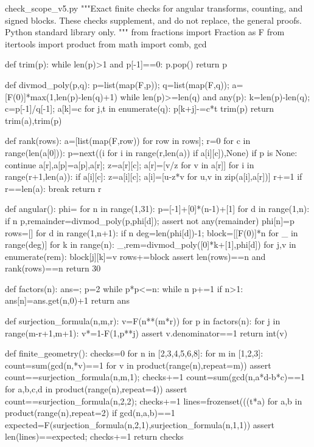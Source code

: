 \begin{filecontents*}[overwrite]{check_scope_v5.py}
"""Exact finite checks for angular transforms, counting, and signed blocks.
These checks supplement, and do not replace, the general proofs.
Python standard library only.
"""
from fractions import Fraction as F
from itertools import product
from math import comb, gcd

def trim(p):
    while len(p)>1 and p[-1]==0: p.pop()
    return p

def divmod_poly(p,q):
    p=list(map(F,p)); q=list(map(F,q)); a=[F(0)]*max(1,len(p)-len(q)+1)
    while len(p)>=len(q) and any(p):
        k=len(p)-len(q); c=p[-1]/q[-1]; a[k]=c
        for j,t in enumerate(q): p[k+j]-=c*t
        trim(p)
    return trim(a),trim(p)

def rank(rows):
    a=[list(map(F,row)) for row in rows]; r=0
    for c in range(len(a[0])):
        p=next((i for i in range(r,len(a)) if a[i][c]),None)
        if p is None: continue
        a[r],a[p]=a[p],a[r]; z=a[r][c]; a[r]=[v/z for v in a[r]]
        for i in range(r+1,len(a)):
            if a[i][c]:
                z=a[i][c]; a[i]=[u-z*v for u,v in zip(a[i],a[r])]
        r+=1
        if r==len(a): break
    return r

def angular():
    phi={}
    for n in range(1,31):
        p=[-1]+[0]*(n-1)+[1]
        for d in range(1,n):
            if n%
                p,remainder=divmod_poly(p,phi[d]); assert not any(remainder)
        phi[n]=p
        rows=[]
        for d in range(1,n+1):
            if n%
            deg=len(phi[d])-1; block=[[F(0)]*n for _ in range(deg)]
            for k in range(n):
                _,rem=divmod_poly([0]*k+[1],phi[d])
                for j,v in enumerate(rem): block[j][k]=v
            rows+=block
        assert len(rows)==n and rank(rows)==n
    return 30

def factors(n):
    ans={}; p=2
    while p*p<=n:
        while n%
        p+=1
    if n>1: ans[n]=ans.get(n,0)+1
    return ans

def surjection_formula(n,m,r):
    v=F(n**(m*r))
    for p in factors(n):
        for j in range(m-r+1,m+1): v*=1-F(1,p**j)
    assert v.denominator==1
    return int(v)

def finite_geometry():
    checks=0
    for n in [2,3,4,5,6,8]:
        for m in [1,2,3]:
            count=sum(gcd(n,*v)==1 for v in product(range(n),repeat=m))
            assert count==surjection_formula(n,m,1); checks+=1
        count=sum(gcd(n,a*d-b*c)==1 for a,b,c,d in product(range(n),repeat=4))
        assert count==surjection_formula(n,2,2); checks+=1
        lines={frozenset(((t*a)%
               for a,b in product(range(n),repeat=2) if gcd(n,a,b)==1}
        expected=F(surjection_formula(n,2,1),surjection_formula(n,1,1))
        assert len(lines)==expected; checks+=1
    return checks


\end{filecontents*}
